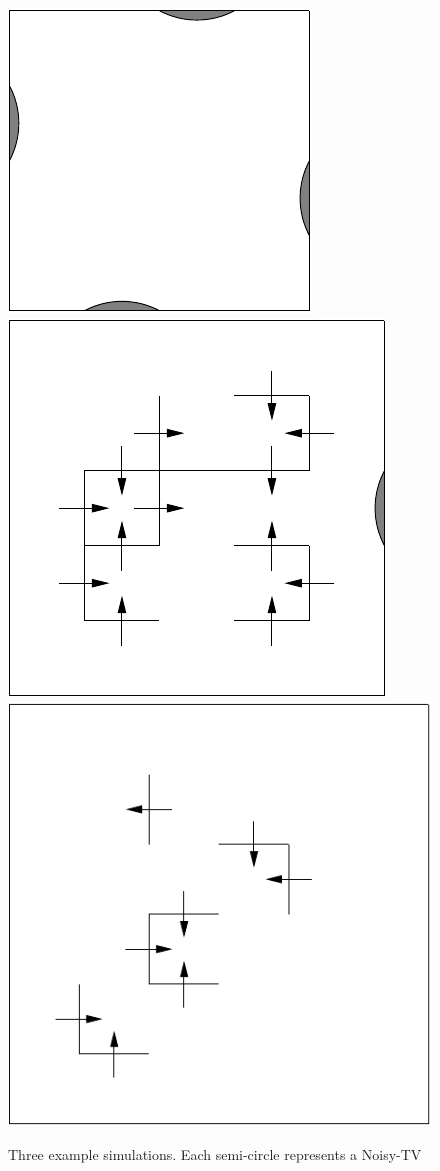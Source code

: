 \documentclass[12pt]{thesis}
\begin{document}
\begin{figure}
	\begin{center}
		\includegraphics[scale=0.75]{"images/4-TV.pdf"}
		\includegraphics[scale=0.75]{"images/1-TV.pdf"}
		\includegraphics[scale=0.75]{"images/No-TV.pdf"}
	\end{center}
	\caption{Three example simulations. Each semi-circle represents a Noisy-TV}
	\label{Fig:Sim}
\end{figure}
\end{document}
